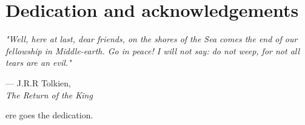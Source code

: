 %
%

\chapter*{Dedication and acknowledgements}
\epigraph{\hspace{4ex}\textit{"Well, here at last, dear friends, on the shores of the Sea comes the end of our fellowship in Middle-earth. Go in peace! I will not say: do not weep, for not all tears are an evil."}}{--- J.R.R Tolkien,\\ \textit{The Return of the King}}

\begin{SingleSpace}
ere goes the dedication.
\end{SingleSpace}
\clearpage